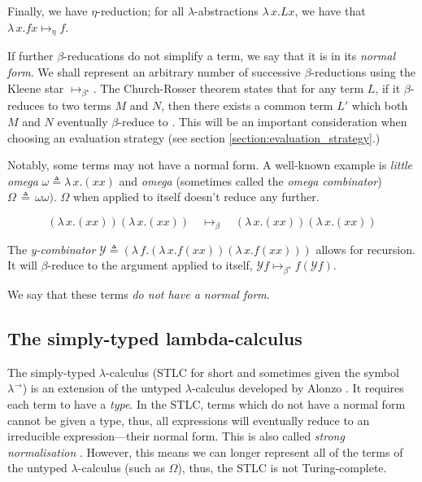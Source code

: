 \documentclass[logo,bsc,singlespacing,parskip,online]{infthesis}
\begin{document}
Finally, we have $\eta$-reduction; for all $\lambda$-abstractions $\lambda \, x. L x$, we have that
$\lambda \, x. f x \mapsto_{\eta} f$.

If further $\beta$-reducations do not simplify a term, we say that it is in its \textit{normal
form}. We shall represent an arbitrary number of successive $\beta$-reductions using the Kleene star
$\mapsto_{\beta^{\star}}$. The Church-Rosser theorem states that for any term $L$, if it
$\beta$-reduces to two terms $M$ and $N$, then there exists a common term $L'$ which both $M$ and
$N$ eventually $\beta$-reduce to \citep{church_properties_1936}. This will be an important
consideration when choosing an evaluation strategy (see section \ref{section:evaluation_strategy}.)

Notably, some terms may not have a normal form. A well-known example is \textit{little omega} $\omega
\triangleq \lambda \, x. (x x)$ and \textit{omega} (sometimes called the \textit{omega combinator})
$\Omega \, \triangleq \, \omega \omega)$. $\Omega$ when applied to itself doesn't reduce any further.

\begin{equation*}
  (\lambda \, x. (x x)) (\lambda \, x. (x x)) \quad
  \mapsto_{\beta} \quad (\lambda \, x. (x x)) (\lambda \, x. (x x))
\end{equation*}

The \textit{y-combinator} $\mathcal{Y} \triangleq (\lambda \, f. (\lambda \, x. f (x x )) (\lambda
\, x. f (xx)))$ allows for recursion. It will $\beta$-reduce to the argument applied to itself,
$\mathcal{Y} f \mapsto_{\beta^{\star}} f (\mathcal{Y} f)$.

We say that these terms \textit{do not have a normal form}.

\subsection{The simply-typed lambda-calculus}
The simply-typed $\lambda$-calculus (STLC for short and sometimes given the symbol
$\lambda^{\rightarrow}$) is an extension of the untyped $\lambda$-calculus developed by Alonzo
\citet{church_formulation_1940}. It requires each term to have a \textit{type}. In the STLC, terms
which do not have a normal form cannot be given a type, thus, all expressions will eventually reduce
to an irreducible expression---their normal form. This is also called \textit{strong normalisation}
\citep{pierce_types_2002}. However, this means we can longer represent all of the terms of the
untyped $\lambda$-calculus (such as $\Omega$), thus, the STLC is not Turing-complete.
\end{document}
